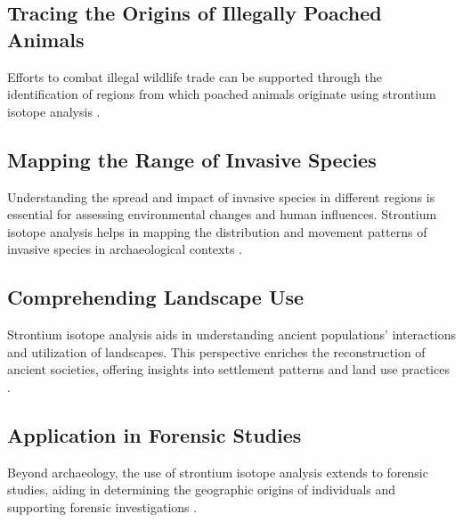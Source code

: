\documentclass[a4paper, 12pt]{article}
\begin{document}
\subsection{Tracing the Origins of Illegally Poached Animals}
Efforts to combat illegal wildlife trade can be supported through the identification of regions from which poached animals originate using strontium isotope analysis \citep{crowley2017}.

\subsection{Mapping the Range of Invasive Species}
Understanding the spread and impact of invasive species in different regions is essential for assessing environmental changes and human influences. Strontium isotope analysis helps in mapping the distribution and movement patterns of invasive species in archaeological contexts \citep{crowley2017}.

\subsection{Comprehending Landscape Use}
Strontium isotope analysis aids in understanding ancient populations' interactions and utilization of landscapes. This perspective enriches the reconstruction of ancient societies, offering insights into settlement patterns and land use practices \citep{crowley2017}.

\subsection{Application in Forensic Studies}
Beyond archaeology, the use of strontium isotope analysis extends to forensic studies, aiding in determining the geographic origins of individuals and supporting forensic investigations \citep{kamenov2014}.


\end{document}
